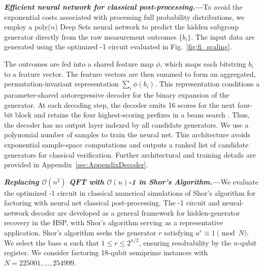 \documentclass[reprint, aps, prl, superscriptaddress]{revtex4-2}
\newcommand{\rev}[1]{\textcolor{revisioncolor}{#1}}
\renewcommand{\section}[1]{\par\medskip\noindent\textbf{{\textit{#1.}---}}}
\newcommand{\myqc}{\text{HP}}
\begin{document}
\section{Efficient neural network for classical post-processing}To avoid the exponential costs associated with processing full probability distributions, we employ a poly($n$) Deep Sets neural network \cite{zaheer2017deep, edwards2016towards} to predict the hidden subgroup generator directly from the raw measurement outcomes $\{b_i\}$. The input data are generated using the optimized \myqc-1 circuit evaluated in Fig.~\ref{fig:fi_scaling}. 

\rev{The outcomes are fed into a shared feature map \(\phi\), which maps each bitstring \(b_i\) to a feature vector. }
The feature vectors are then summed to form an aggregated, permutation-invariant representation $\sum_i\phi(b_i)$. \rev{This representation conditions a parameter-shared autoregressive decoder for the binary expansion of the generator. At each decoding step, the decoder emits 16 scores for the next four-bit block and retains the four highest-scoring prefixes in a beam search \cite{sutskever2014sequence, wiseman2016sequence}. Thus, the decoder has no output layer indexed by all candidate generators.} We use a polynomial number of samples to train the neural net. This architecture avoids exponential sample-space computations and outputs a ranked list of candidate generators for classical verification.
\rev{Further architectural and training details are provided in Appendix~\ref{sec:AppendixDecoder}.}

\section{Replacing \texorpdfstring{$\mathcal{O}(n^2)$}{O(n2)} QFT with \texorpdfstring{$\mathcal{O}(n)$}{O(n)}\myqc{}-1 in Shor's Algorithm}We evaluate the optimized \myqc{}-1 circuit in classical numerical simulations of Shor's algorithm for factoring with neural net classical post-processing. \rev{The \myqc{}-1 circuit and neural-network decoder are developed as a general framework for hidden-generator recovery in the HSP, with Shor's algorithm serving as a representative application.} Shor's algorithm seeks the generator $r$ satisfying $a^r \equiv 1 \pmod{N}$. We select the base $a$ such that $1 \le r \le 2^{n/2}$, ensuring resolvability by the $n$-qubit register. \rev{We consider factoring 18-qubit semiprime instances with \(N=225001,\ldots,254999\).}
\end{document}
